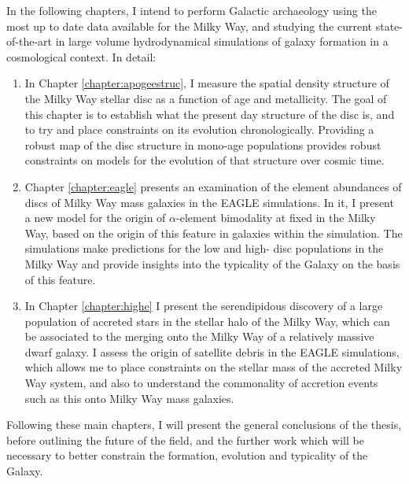 In the following chapters, I intend to perform Galactic archaeology using the most up to date data available for the Milky Way, and studying the current state-of-the-art in large volume hydrodynamical simulations of galaxy formation in a cosmological context. In detail:
\begin{enumerate}
    \item In Chapter \ref{chapter:apogeestruc}, I measure the spatial density structure of the Milky Way stellar disc as a function of age and metallicity. The goal of this chapter is to establish what the present day structure of the disc is, and to try and place constraints on its evolution chronologically. Providing a robust map of the disc structure in mono-age populations provides robust constraints on models for the evolution of that structure over cosmic time.
    \item Chapter \ref{chapter:eagle} presents an examination of the element abundances of discs of Milky Way mass galaxies in the EAGLE simulations. In it, I present a new model for the origin of $\alpha$-element bimodality at fixed \feh{} in the Milky Way, based on the origin of this feature in galaxies within the simulation. The simulations make predictions for the low and high-\afe{} disc populations in the Milky Way and provide insights into the typicality of the Galaxy on the basis of this feature.
    \item In Chapter \ref{chapter:highe} I present the serendipidous discovery of a large population of accreted stars in the stellar halo of the Milky Way, which can be associated to the merging onto the Milky Way of a relatively massive dwarf galaxy. I assess the origin of satellite debris in the EAGLE simulations, which allows me to place constraints on the stellar mass of the accreted Milky Way system, and also to understand the commonality of accretion events such as this onto Milky Way mass galaxies.
\end{enumerate}
Following these main chapters, I will present the general conclusions of the thesis, before outlining the future of the field, and the further work which will be necessary to better constrain the formation, evolution and typicality of the Galaxy.




